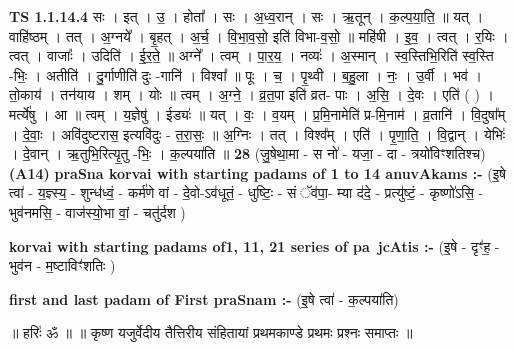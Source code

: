 \documentclass[17pt]{extarticle}
\begin{document}
                  \newline
                                \textbf{ TS 1.1.14.4} \newline
                  सः । इत् । उ॒ । होता᳚ । सः । अ॒ध्व॒रान् । सः । ऋ॒तून् । क॒ल्प॒या॒ति॒ ॥ यत् । वाहि॑ष्ठम् । तत् । अ॒ग्नये᳚ । बृ॒हत् । अ॒र्च॒ । वि॒भा॒व॒सो॒ इति॑ विभा-व॒सो॒ ॥ महि॑षी । इ॒व॒ । त्वत् । र॒यिः । त्वत् । वाजाः᳚ । उदिति॑ । ई॒र॒ते॒ ॥ अग्ने᳚ । त्वम् । पा॒र॒य॒ । नव्यः॑ । अ॒स्मान् । स्व॒स्तिभि॒रिति॑ स्व॒स्ति -भिः॒ । अतीति॑ । दु॒र्गाणीति॑ दुः -गानि॑ । विश्वा᳚ ॥ पूः । च॒ । पृ॒थ्वी । ब॒हु॒ला । नः॒ । उ॒र्वी । भव॑ । तो॒काय॑ । तन॑याय । शम् । योः ॥ त्वम् । अ॒ग्ने॒ । व्र॒त॒पा इति॑ व्रत- पाः । अ॒सि॒ । दे॒वः । एति॑ ( ) । मर्त्ये॑षु । आ ॥ त्वम् । य॒ज्ञेषु॑ । ईड्यः॑ ॥ यत् । वः॒ । व॒यम् । प्र॒मि॒नामेति॑ प्र-मि॒नाम॑ । व्र॒तानि॑ । वि॒दुषा᳚म् । दे॒वाः॒ । अवि॑दुष्टरास॒ इत्यवि॑दुः - त॒रा॒सः॒ ॥ अ॒ग्निः । तत् । विश्व᳚म् । एति॑ । पृ॒णा॒ति॒ । वि॒द्वान् । येभिः॑ । दे॒वान् । ऋ॒तुभि॒रित्यृ॒तु -भिः॒ । क॒ल्पया॑ति ॥ \textbf{  28} \newline
                  \newline
                      (जु॒षेथा॒मा - स नो॑ - यजा॒ - दा - त्रयो॑विꣳशतिश्च)  \textbf{(A14)} \newline \newline
\textbf{praSna korvai with starting padams of 1 to 14 anuvAkams :-} \newline
(इ॒षे त्वा॑ - य॒ज्ञ्स्य॒ - शुन्ध॑ध्वं॒ - कर्म॑णे वां - दे॒वो-ऽव॑धूतं॒ - धुष्टिः॒ - सं ॅव॑पा॒- म्या द॑दे॒ - प्रत्यु॑ष्टं॒ - कृष्णो॑ऽसि॒ - भुव॑नमसि॒ - वाज॑स्यो॒भा वां॒ - चतु॑र्दश ) \newline

\textbf{korvai with starting padams of1, 11, 21 series of pa~jcAtis :-} \newline
(इ॒षे - दृꣳ॑ह॒ - भुव॑न - म॒ष्टाविꣳ॑शतिः ) \newline

\textbf{first and last padam of First praSnam :-} \newline
(इ॒षे त्वा॑ - क॒ल्पया॑ति) \newline 


॥ हरिः॑ ॐ ॥
॥ कृष्ण यजुर्वेदीय तैत्तिरीय संहितायां प्रथमकाण्डे प्रथमः प्रश्नः समाप्तः ॥ \newline
\pagebreak
\pagebreak
        
\end{document}
